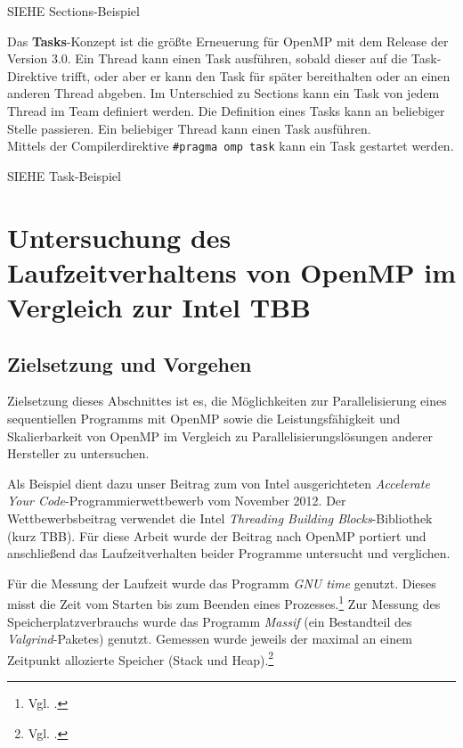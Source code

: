\documentclass[11pt]{scrartcl}
\begin{document}
SIEHE Sections-Beispiel

Das \textbf{Tasks}-Konzept ist die größte Erneuerung für OpenMP mit dem Release der Version 3.0. Ein Thread kann einen Task ausführen, sobald dieser auf die Task-Direktive trifft, oder aber er kann den Task für später bereithalten oder an einen anderen Thread abgeben. Im Unterschied zu Sections kann ein Task von jedem Thread im Team definiert werden. Die Definition eines Tasks kann an beliebiger Stelle passieren. Ein beliebiger Thread kann einen Task ausführen. \\
Mittels der Compilerdirektive \texttt{\#pragma omp task} kann ein Task gestartet werden. 

SIEHE Task-Beispiel 

\pagebreak %

\section{Untersuchung des Laufzeitverhaltens von OpenMP im Vergleich zur Intel TBB}

\subsection{Zielsetzung und Vorgehen}

Zielsetzung dieses Abschnittes ist es, die Möglichkeiten zur Parallelisierung eines sequentiellen Programms mit OpenMP
sowie die Leistungsfähigkeit und Skalierbarkeit von OpenMP im Vergleich zu Parallelisierungslösungen anderer Hersteller
zu untersuchen.

Als Beispiel dient dazu unser Beitrag zum von Intel ausgerichteten \emph{Accelerate Your Code}-Programmierwettbewerb vom
November 2012. Der Wettbewerbsbeitrag verwendet die Intel \emph{Threading Building Blocks}-Bibliothek (kurz TBB). Für
diese Arbeit wurde der Beitrag nach OpenMP portiert und anschließend das Laufzeitverhalten beider Programme untersucht
und verglichen.

Für die Messung der Laufzeit wurde das Programm \emph{GNU time} genutzt. Dieses misst die Zeit vom Starten bis zum Beenden eines Prozesses.\footnote{Vgl. \cite{time_man_2012}.}
Zur Messung des Speicherplatzverbrauchs wurde das Programm \emph{Massif} (ein Bestandteil des \emph{Valgrind}-Paketes) genutzt. Gemessen wurde jeweils der maximal an einem Zeitpunkt allozierte Speicher (Stack und Heap).\footnote{Vgl. \cite[S. 136ff.]{valgrind_2012}.}
\end{document}
